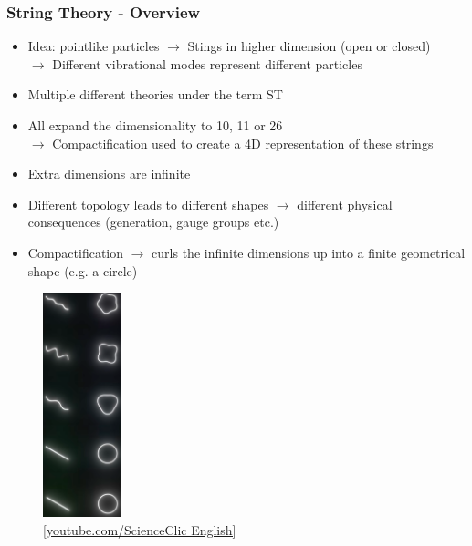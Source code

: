 \documentclass[aspectratio=1610, 9pt]{beamer}
\begin{document}
\begin{frame}
	\frametitle{String Theory - Overview}
	\begin{minipage}{0.7\textwidth}
		\begin{itemize}
			\item Idea: pointlike particles $\rightarrow$ Stings in higher dimension (open or closed)\\
			$\rightarrow$ Different vibrational modes represent different particles
			\item Multiple different theories under the term ST
			\item All expand the dimensionality to 10, 11 or 26\\
			$\rightarrow$ Compactification used to create a 4D representation of these strings
			\item Extra dimensions are infinite
			\item Different topology leads to different shapes $\rightarrow$ different physical consequences (generation, gauge groups etc.)
			\item Compactification $\rightarrow$ curls the infinite dimensions up into a finite geometrical shape (e.g. a circle) %
			
		\end{itemize}
	\end{minipage}
	\hfill
	\begin{minipage}{0.25\textwidth}
			\begin{figure}
					\centering
					\includegraphics[width=2.25cm]{images/modes.png}
          \caption{\href{https://www.youtube.com/watch?v=n7cOlBxtKSo}{[youtube.com/ScienceClic English]}}
				\end{figure}
		\end{minipage}
\end{frame}
\end{document}

